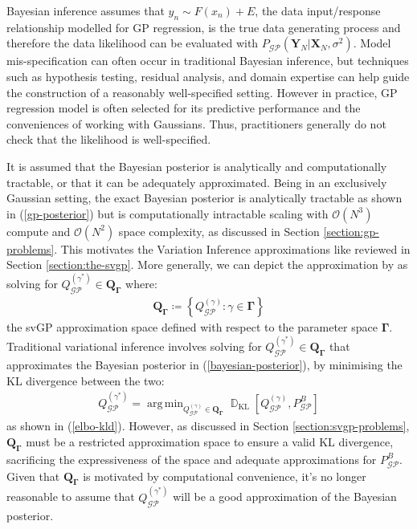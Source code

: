 \documentclass{article}
\newcommand{\D}{\operatorname{\mathbb{D}}}
\newcommand{\GP}{\operatorname{\mathcal{GP}}}
\DeclareMathOperator*{\argmin}{arg\,min}
\numberwithin{equation}{section}
\begin{document}
 Bayesian inference assumes that $y_n \sim F(x_n) + E$, the data input/response relationship modelled for GP regression, is the true data generating process and therefore the data likelihood can be evaluated with $P_{\GP}\left(\mathbf{Y}_N \vert \mathbf{X}_N, \sigma^2\right)$. Model mis-specification can often occur in traditional Bayesian inference, but techniques such as hypothesis testing, residual analysis, and domain expertise can help guide the construction of a reasonably well-specified setting. However in practice, GP regression model is often selected for its predictive performance and the conveniences of working with Gaussians. Thus, practitioners generally do not check that the likelihood is well-specified. 
 
It is assumed that the Bayesian posterior is analytically and computationally tractable, or that it can be adequately approximated. Being in an exclusively Gaussian setting, the exact Bayesian posterior is analytically tractable as shown in (\ref{gp-posterior}) but is computationally intractable scaling with $\mathcal{O}(N^3)$ compute and $\mathcal{O}(N^2)$ space complexity, as discussed in Section \ref{section:gp-problems}. This motivates the Variation Inference approximations like \cite{titsias2009variational} reviewed in Section \ref{section:the-svgp}. More generally, we can depict the approximation by \cite{titsias2009variational} as solving for $Q_{\GP}^{(\gamma^*)} \in \boldsymbol{Q}_{\mathbf{\Gamma}}$ where:
\begin{align}
    \boldsymbol{Q}_{\boldsymbol{\Gamma}} \coloneqq \left\{Q_{\GP}^{(\gamma)}: \gamma \in \mathbf{\Gamma}\right\}
    \label{svgp-space}
\end{align}
the svGP approximation space defined with respect to the parameter space $\mathbf{\Gamma}$. Traditional variational inference involves solving for $Q_{\GP}^{(\gamma^*)} \in \boldsymbol{Q}_{\boldsymbol{\Gamma}}$ that approximates the Bayesian posterior in (\ref{bayesian-posterior}), by minimising the KL divergence between the two: 
\begin{align}
Q^{(\gamma^*)}_{\GP} = \argmin_{Q^{(\gamma)}_{\GP} \in \boldsymbol{Q}_{\boldsymbol{\Gamma}}}\D_{\text{KL}}\left[Q_{\GP}^{(\gamma)}, P_{\GP}^B\right]
\end{align}
as shown in (\ref{elbo-kld}).
However, as discussed in Section \ref{section:svgp-problems}, $\boldsymbol{Q}_{\boldsymbol{\Gamma}}$ must be a restricted approximation space to ensure a valid KL divergence, sacrificing the expressiveness of the space and adequate approximations for $P_{\GP}^B$. Given that $\boldsymbol{Q}_{\boldsymbol{\Gamma}}$ is motivated by computational convenience, it's no longer reasonable to assume that $Q_{\GP}^{(\gamma^*)}$ will be a good approximation of the Bayesian posterior.
\end{document}
